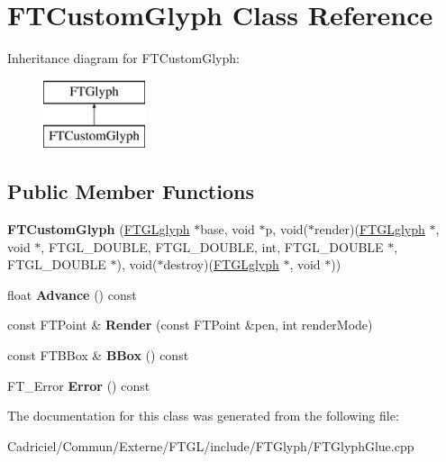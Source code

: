 \hypertarget{class_f_t_custom_glyph}{}\section{F\+T\+Custom\+Glyph Class Reference}
\label{class_f_t_custom_glyph}
Inheritance diagram for F\+T\+Custom\+Glyph\+:\begin{figure}[H]
\begin{center}
\leavevmode
\includegraphics[height=2.000000cm]{class_f_t_custom_glyph}
\end{center}
\end{figure}
\subsection*{Public Member Functions}
\begin{DoxyCompactItemize}
\item 
{\bfseries F\+T\+Custom\+Glyph} (\hyperlink{struct___f_t_g_lglyph}{F\+T\+G\+Lglyph} $\ast$base, void $\ast$p, void($\ast$render)(\hyperlink{struct___f_t_g_lglyph}{F\+T\+G\+Lglyph} $\ast$, void $\ast$, F\+T\+G\+L\+\_\+\+D\+O\+U\+B\+LE, F\+T\+G\+L\+\_\+\+D\+O\+U\+B\+LE,                                                                                                                               int, F\+T\+G\+L\+\_\+\+D\+O\+U\+B\+LE $\ast$, F\+T\+G\+L\+\_\+\+D\+O\+U\+B\+LE $\ast$), void($\ast$destroy)(\hyperlink{struct___f_t_g_lglyph}{F\+T\+G\+Lglyph} $\ast$, void $\ast$))\hypertarget{class_f_t_custom_glyph_abd191f1542bfd6d483bdf9dfd22957ec}{}\label{class_f_t_custom_glyph_abd191f1542bfd6d483bdf9dfd22957ec}

\item 
float {\bfseries Advance} () const \hypertarget{class_f_t_custom_glyph_aa8f17e3a9547eafed913e2b8f9b70958}{}\label{class_f_t_custom_glyph_aa8f17e3a9547eafed913e2b8f9b70958}

\item 
const F\+T\+Point \& {\bfseries Render} (const F\+T\+Point \&pen, int render\+Mode)\hypertarget{class_f_t_custom_glyph_a29285cf4a9b5476a80b01e1678272bd6}{}\label{class_f_t_custom_glyph_a29285cf4a9b5476a80b01e1678272bd6}

\item 
const F\+T\+B\+Box \& {\bfseries B\+Box} () const \hypertarget{class_f_t_custom_glyph_aebed1d1515a24d6410f4c3f44686b75c}{}\label{class_f_t_custom_glyph_aebed1d1515a24d6410f4c3f44686b75c}

\item 
F\+T\+\_\+\+Error {\bfseries Error} () const \hypertarget{class_f_t_custom_glyph_a8a74b76186fb02da48849c3c094fb72e}{}\label{class_f_t_custom_glyph_a8a74b76186fb02da48849c3c094fb72e}

\end{DoxyCompactItemize}


The documentation for this class was generated from the following file\+:\begin{DoxyCompactItemize}
\item 
Cadriciel/\+Commun/\+Externe/\+F\+T\+G\+L/include/\+F\+T\+Glyph/F\+T\+Glyph\+Glue.\+cpp\end{DoxyCompactItemize}
